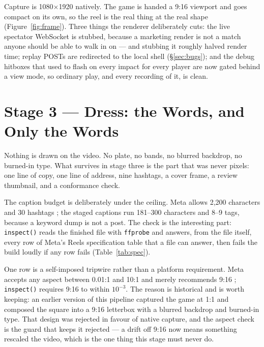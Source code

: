 \documentclass[10pt,letterpaper,twocolumn]{article}
\newcommand{\code}[1]{\texttt{#1}}
\begin{document}
Capture is 1080$\times$1920 natively. The game is handed a 9{:}16 viewport and
goes compact on its own, so the reel is the real thing at the real shape
(Figure~\ref{fig:frame}). Three things the renderer deliberately cuts: the live
spectator WebSocket is stubbed, because a marketing render is not a match anyone
should be able to walk in on --- and stubbing it roughly halved render time;
replay POSTs are redirected to the local shell (\S\ref{sec:bugs}); and the debug
hitboxes that used to flash on every impact for every player are now gated
behind a view mode, so ordinary play, and every recording of it, is clean.

\section{Stage 3 --- Dress: the Words, and Only the Words}

Nothing is drawn on the video. No plate, no bands, no blurred backdrop, no
burned-in type. What survives in stage three is the part that was never pixels:
one line of copy, one line of address, nine hashtags, a cover frame, a review
thumbnail, and a conformance check.

The caption budget is deliberately under the ceiling. Meta allows 2,200
characters and 30 hashtags \cite{metaPublishing}; the staged captions run
181--300 characters and 8--9 tags, because a keyword dump is not a post. The
check is the interesting part: \code{inspect()} reads the finished file with
\code{ffprobe} and answers, from the file itself, every row of Meta's Reels
specification table that a file can answer, then fails the build loudly if any
row fails (Table~\ref{tab:spec}).

One row is a self-imposed tripwire rather than a platform requirement. Meta
accepts any aspect between 0.01{:}1 and 10{:}1 and merely recommends 9{:}16
\cite{metaMedia}; \code{inspect()} requires 9{:}16 to within $10^{-3}$. The
reason is historical and is worth keeping: an earlier version of this pipeline
captured the game at 1{:}1 and composed the square into a 9{:}16 letterbox with
a blurred backdrop and burned-in type. That design was rejected in favour of
native capture, and the aspect check is the guard that keeps it rejected --- a
drift off 9{:}16 now means something rescaled the video, which is the one thing
this stage must never do.
\end{document}
